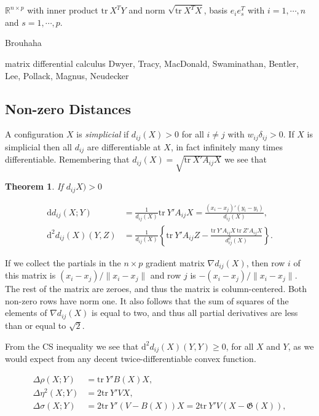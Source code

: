 \documentclass[
  12pt,
]{book}
\newtheorem{theorem}{Theorem}[chapter]
\theoremstyle{definition}
\theoremstyle{definition}
\theoremstyle{definition}
\theoremstyle{definition}
\theoremstyle{remark}
\begin{document}
\(\mathbb{R}^{n\times p}\) with inner product \(\text{tr}\ X^TY\) and norm \(\sqrt{\text{tr}\ X^TX}\), basis
\(e_ie_s^T\) with \(i=1,\cdots,n\) and \(s=1,\cdots,p\).

Brouhaha

matrix differential calculus Dwyer, Tracy, MacDonald, Swaminathan, Bentler, Lee, Pollack, Magnus, Neudecker

\hypertarget{non-zero-distances}{%
\subsection{Non-zero Distances}\label{non-zero-distances}}

A configuration \(X\) is \emph{simplicial} if \(d_{ij}(X)>0\) for all \(i\not= j\) with \(w_{ij}\delta_{ij}>0\). If \(X\) is simplicial then all \(d_{ij}\) are differentiable at \(X\), in fact infinitely many times differentiable. Remembering that \(d_{ij}(X)=\sqrt{\text{tr}\ X'A_{ij}X}\) we see that

\begin{theorem}
\protect\hypertarget{thm:distdiff}{}\label{thm:distdiff}If \(d_{ij}X)>0\)

\begin{align}
\mathrm{d}d_{ij}(X;Y)&=\frac{1}{d_{ij}(X)}\text{tr}\ Y'A_{ij}X=\frac{(x_i-x_j)'(y_i-y_i)}{d_{ij}(X)},\\
\mathrm{d}^2 d_{ij}(X)(Y,Z)&=\frac{1}{d_{ij}(X)}\left\{
\text{tr}\ Y'A_{ij}Z-\frac{\text{tr}\ Y'A_{ij}X\ \text{tr}\ Z'A_{ij}X}{d_{ij}^2(X)}\right\}.
\end{align}
\end{theorem}

If we collect the partials in the \(n\times p\) gradient matrix \(\nabla d_{ij}(X)\), then row \(i\) of this matrix is \((x_i-x_j)/\|x_i-x_j\|\) and row \(j\) is \(-(x_i-x_j)/\|x_i-x_j\|\). The rest of the matrix are zeroes, and thus the matrix is column-centered. Both non-zero rows have norm one. It also follows that the sum of squares of the elements of \(\nabla d_{ij}(X)\) is equal to two, and thus all partial derivatives are less than or equal to \(\sqrt{2}\).

From the CS inequality we see that \(\mathrm{d}^2 d_{ij}(X)(Y,Y)\geq 0\), for all \(X\) and \(Y\), as we would expect from any decent twice-differentiable convex function.

\begin{align}
\Delta\rho(X;Y)&=\text{tr}\ Y'B(X)X,\\
\Delta\eta^2(X;Y)&=2\text{tr}\ Y'VX,\\
\Delta\sigma(X;Y)&=2\text{tr}\ Y'(V-B(X))X=2\text{tr}\ Y'V(X-\mathfrak{G}(X)),
\end{align}
\end{document}
